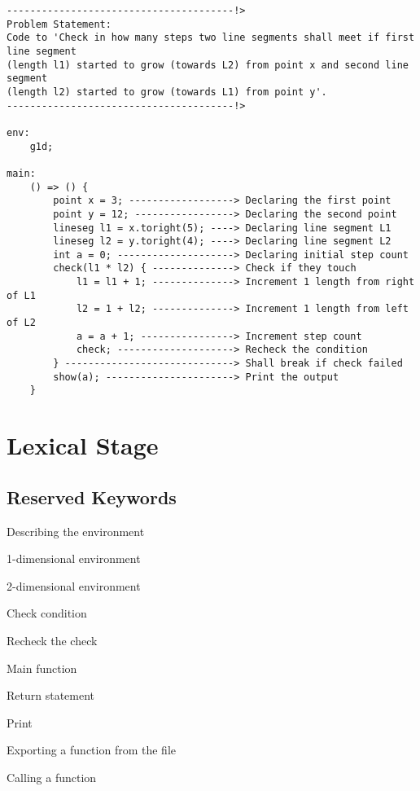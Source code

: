 \documentclass{article}
\begin{document}
\begin{verbatim}
---------------------------------------!>
Problem Statement:
Code to 'Check in how many steps two line segments shall meet if first line segment
(length l1) started to grow (towards L2) from point x and second line segment
(length l2) started to grow (towards L1) from point y'.
---------------------------------------!>

env:
    g1d;

main:
    () => () {
        point x = 3; ------------------> Declaring the first point
        point y = 12; -----------------> Declaring the second point
        lineseg l1 = x.toright(5); ----> Declaring line segment L1
        lineseg l2 = y.toright(4); ----> Declaring line segment L2
        int a = 0; --------------------> Declaring initial step count
        check(l1 * l2) { --------------> Check if they touch
            l1 = l1 + 1; --------------> Increment 1 length from right of L1
            l2 = 1 + l2; --------------> Increment 1 length from left of L2
            a = a + 1; ----------------> Increment step count
            check; --------------------> Recheck the condition
        } -----------------------------> Shall break if check failed
        show(a); ----------------------> Print the output
    }
\end{verbatim}

\section{Lexical Stage}

\subsection{Reserved Keywords}

\begin{description}[labelwidth=5cm]
  \item[env] Describing the environment 
  \item[g1d] 1-dimensional environment
  \item[g2d] 2-dimensional environment
  \item[check] Check condition
  \item[recheck] Recheck the check
  \item[main] Main function
  \item[return] Return statement
  \item[show] Print
  \item[export] Exporting a function from the file
  \item[call] Calling a function
\end{description}
\end{document}
